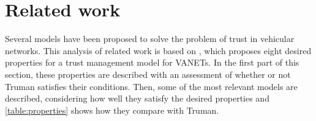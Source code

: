 \documentclass[conference]{IEEEtran}
\begin{document}
%




\section{Related work}
\label{section:previouswork}

Several models have been proposed to solve the problem of trust in vehicular networks. 
This analysis of related work is based on \cite{zhang2011survey}, which proposes eight desired properties for a trust management model for VANETs.
In the first part of this section, these properties are described with an assessment of whether or not Truman satisfies their conditions.
Then, some of the most relevant models are described, considering how well they satisfy the desired properties and \autoref{table:properties} shows how they compare with Truman.
\end{document}

